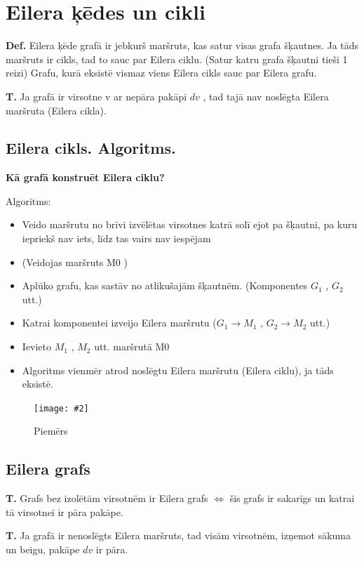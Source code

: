 \documentclass{article}
\newcommand{\illustration}[3]{
	\begin{figure}[H]
		\centering	
		\texttt{[image: \#2]}
		\caption{#3}
	\end{figure}
}
\begin{document}
\section{Eilera ķēdes un cikli}


\textbf{Def.}  Eilera ķēde grafā ir jebkurš maršruts, kas satur visas grafa šķautnes.
Ja tāds maršruts ir cikls, tad to sauc par Eilera ciklu. (Satur katru grafa šķautni tieši 1 reizi) Grafu, kurā eksistē vismaz viens Eilera cikls sauc par Eilera grafu.

\textbf{T. } Ja grafā ir virsotne v ar nepāra pakāpi $dv$ , tad tajā nav noslēgta Eilera maršruta (Eilera cikla). 

\subsection{Eilera cikls. Algoritms.}
\textbf{Kā grafā konstruēt Eilera ciklu?}

Algoritms:
\begin{itemize}
	\item Veido maršrutu no brīvi izvēlētas virsotnes katrā solī ejot pa šķautni, pa kuru iepriekš nav iets, līdz tas vairs nav iespējam
	\item (Veidojas maršruts M0 )
	\item Aplūko grafu, kas sastāv no atlikušajām šķautnēm. (Komponentes $G_1$ , $G_2$ utt.)
	\item Katrai komponentei izveijo Eilera maršrutu ($G_1 → M_1$ , $G_2 → M_2 $ utt.)
	\item Ievieto $M_1$ , $M_2$ utt. maršrutā M0
	\item Algoritms vienmēr atrod noslēgtu Eilera maršrutu (Eilera ciklu), ja tāds eksistē.
\end{itemize}

\illustration{1}{Euler_cycle_build-1}{Piemērs}

\subsection{Eilera grafs}

\textbf{T. } Grafs bez izolētām virsotnēm ir Eilera grafs $\Leftrightarrow $ šis grafs ir sakarīgs un katrai tā virsotnei ir pāra pakāpe.

\textbf{T. } Ja grafā ir nenoslēgts Eilera maršruts, tad visām virsotnēm, izņemot sākuma un beigu, pakāpe $dv$ ir pāra.
\end{document}
